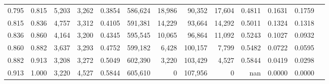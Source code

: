 \begin{tabular}{rrrrrrrrrrrrr}
0.795 & 0.815 &  5,203 & 3,262 &                                     0.3854 & 586,624 &  18,986 &  90,352 &  17,604 & 0.4811 & 0.1631 & 0.1759 \\
0.815 & 0.836 &  4,757 & 3,312 &                                     0.4105 & 591,381 &  14,229 &  93,664 &  14,292 & 0.5011 & 0.1324 & 0.1318 \\
0.836 & 0.860 &  4,164 & 3,200 &                                     0.4345 & 595,545 &  10,065 &  96,864 &  11,092 & 0.5243 & 0.1027 & 0.0932 \\
0.860 & 0.882 &  3,637 & 3,293 &                                     0.4752 & 599,182 &   6,428 & 100,157 &   7,799 & 0.5482 & 0.0722 & 0.0595 \\
0.882 & 0.913 &  3,208 & 3,272 &                                     0.5049 & 602,390 &   3,220 & 103,429 &   4,527 & 0.5844 & 0.0419 & 0.0298 \\
0.913 & 1.000 &  3,220 & 4,527 &                                     0.5844 & 605,610 &       0 & 107,956 &       0 &    nan & 0.0000 & 0.0000 \\
\bottomrule
\end{tabular}
